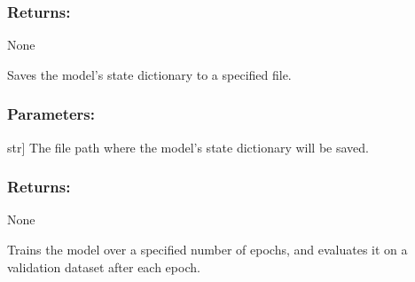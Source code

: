\documentclass[a4paper,10pt,english]{sphinxmanual}
\begin{document}
\begin{fulllineitems}
\begin{fulllineitems}
\begin{description}
\end{description}


\subsubsection{Returns:}
\label{\detokenize{models:id31}}
\sphinxAtStartPar
None

\end{fulllineitems}


\begin{fulllineitems}
\label{\detokenize{models:fireDiff.Models.deterministicmodel.PredictionModel.save_model}}
\pysigstartsignatures
{}
\pysigstopsignatures
\sphinxAtStartPar
Saves the model’s state dictionary to a specified file.


\subsubsection{Parameters:}
\label{\detokenize{models:id32}}\begin{description}
\sphinxlineitem{path}{[}str{]}
\sphinxAtStartPar
The file path where the model’s state dictionary will be saved.

\end{description}


\subsubsection{Returns:}
\label{\detokenize{models:id33}}
\sphinxAtStartPar
None

\end{fulllineitems}


\begin{fulllineitems}
\label{\detokenize{models:fireDiff.Models.deterministicmodel.PredictionModel.train_model}}
\pysigstartsignatures
{}
\pysigstopsignatures
\sphinxAtStartPar
Trains the model over a specified number of epochs, and evaluates
it on a validation dataset after each epoch.



\end{fulllineitems}
\end{fulllineitems}
\end{document}

